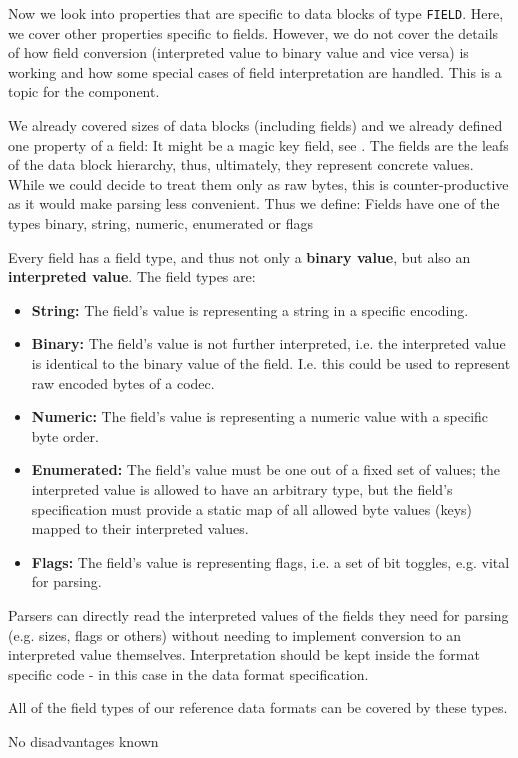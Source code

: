 Now we look into properties that are specific to data blocks of type \texttt{FIELD}. Here, we cover other properties specific to fields. However, we do not cover the details of how field conversion (interpreted value to binary value and vice versa) is working and how some special cases of field interpretation are handled. This is a topic for the \COMPdataPartManagement{} component. 

We already covered sizes of data blocks (including fields) and we already defined one property of a field: It might be a magic key field, see . The fields are the leafs of the data block hierarchy, thus, ultimately, they represent concrete values. While we could decide to treat them only as raw bytes, this is counter-productive as it would make parsing less convenient. Thus we define:
{%
Fields have one of the types binary, string, numeric, enumerated or flags
}
{%
Every field has a field type, and thus not only a \textbf{binary value}, but also an \textbf{interpreted value}. The field types are:
\begin{itemize}
\item \textbf{String:} The field's value is representing a string in a specific encoding.
\item \textbf{Binary:} The field's value is not further interpreted, i.e. the interpreted value is identical to the binary value of the field. I.e. this could be used to represent raw encoded bytes of a codec.
\item \textbf{Numeric:} The field's value is representing a numeric value with a specific byte order.
\item \textbf{Enumerated:} The field's value must be one out of a fixed set of values; the interpreted value is allowed to have an arbitrary type, but the field's specification must provide a static map of all allowed byte values (keys) mapped to their interpreted values.
\item \textbf{Flags:} The field's value is representing flags, i.e. a set of bit toggles, e.g. vital for parsing. 
\end{itemize}
}
{%
Parsers can directly read the interpreted values of the fields they need for parsing (e.g. sizes, flags or others) without needing to implement conversion to an interpreted value themselves. Interpretation should be kept inside the format specific code - in this case in the data format specification.

All of the field types of our reference data formats can be covered by these types. 
}
{%
No disadvantages known
}

